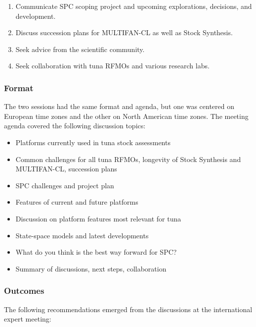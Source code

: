 \documentclass{SCreport}
\begin{document}
\begin{enumerate}
  \item Communicate SPC scoping project and upcoming explorations, decisions,
  and development.
  \item Discuss succession plans for MULTIFAN-CL as well as Stock Synthesis.
  \item Seek advice from the scientific community.
  \item Seek collaboration with tuna RFMOs and various research labs.
\end{enumerate}

\subsubsection{Format}

The two sessions had the same format and agenda, but one was centered on
European time zones and the other on North American time zones. The meeting
agenda covered the following discussion topics:

\begin{itemize}
  \item Platforms currently used in tuna stock assessments\\[-4ex]
  \item Common challenges for all tuna RFMOs, longevity of Stock Synthesis and
  MULTIFAN-CL, succession plans\\[-4ex]
  \item SPC challenges and project plan\\[-4ex]
  \item Features of current and future platforms\\[-4ex]
  \item Discussion on platform features most relevant for tuna\\[-4ex]
  \item State-space models and latest developments\\[-4ex]
  \item What do you think is the best way forward for SPC?\\[-4ex]
  \item Summary of discussions, next steps, collaboration
\end{itemize}

\subsubsection{Outcomes}

The following recommendations emerged from the discussions at the international
expert meeting:
\end{document}
